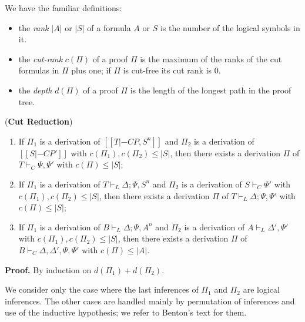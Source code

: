 We have the familiar definitions: 
\begin{itemize}
\item the \emph{rank} $|A|$ or $|S|$ of a formula $A$ or $S$ is the number of the logical symbols in it.
\item the \emph{cut-rank} $c(\Pi)$ of a proof $\Pi$ is the maximum of the ranks of the cut formulas in $\Pi$ plus one; 
if $\Pi$ is cut-free its cut rank is 0.
\item the \emph{depth} $d(\Pi)$ of a proof $\Pi$ is the length of the longest path in the proof tree.
\end{itemize}
\begin{lemma}
\end{lemma} ({\bf Cut Reduction}) 
\begin{enumerate}
\item If $\Pi_1$ is a derivation of $[[T |-C P, S^n]]$ and  $\Pi_2$ is a derivation of $[[S |-C P']]$ with 
$c(\Pi_1), c(\Pi_2) \leq |S|$, then there exists a derivation $\Pi$ of $T\vdash_C \Psi, \Psi'$ with $c(\Pi) \leq |S|$;
\item If $\Pi_1$ is a derivation of $T \vdash_L \Delta; \Psi, S^n$ and  $\Pi_2$ is a derivation of $S \vdash_C\Psi'$ with 
$c(\Pi_1), c(\Pi_2) \leq |S|$, then there exists a derivation $\Pi$ of $T\vdash_L \Delta; \Psi, \Psi'$ with $c(\Pi) \leq |S|$;
\item If $\Pi_1$ is a derivation of $B\vdash_L \Delta; \Psi, A^n$ and  $\Pi_2$ is a derivation of $A \vdash_L\Delta', \Psi'$ with $c(\Pi_1), c(\Pi_2) \leq |S|$, then there exists a derivation $\Pi$ of $B\vdash_C\Delta, \Delta', \Psi, \Psi'$ with $c(\Pi) \leq |A|$.
\end{enumerate}

\noindent
{\bf Proof.} By induction on $d(\Pi_1) + d(\Pi_2)$. 

\noindent
We consider only the case where the last inferences of $\Pi_1$ and $\Pi_2$ are logical inferences. The other cases 
are handled mainly by permutation of inferences and use of the inductive hypothesis; we refer to Benton's text for them.

\vspace{1ex}

